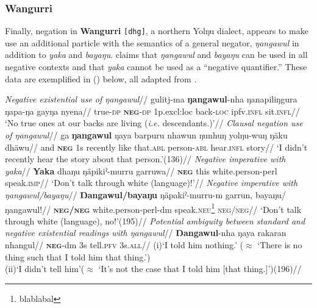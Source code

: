 \subsubsection{Wangurri}

Finally, negation in \textbf{Wangurri} {\tt[dhg]}, a northern Yolŋu dialect, appears to make use an additional particle with the semantics of a general negator, \textit{ŋangawul} in addition to \textit{yaka} and \textit{bayaŋu}. \citet[195]{McLellan1992} claims that \textit{ŋangawul} and \textit{bayaŋu} can be used in all negative contexts and that \textit{yaka} cannot be used as a ``negative quantifier.'' These data are exemplified in (\nextx) below, all adapted from \citet{McLellan1992}.

\pex\a\begingl\glpreamble \textit{Negative existential use of {\em ŋangawul}}//
\gla gulitj-ma \textbf{ŋangawul}-nha ŋanapiliŋgura ŋapa-ŋa gayŋa nyena//
\glb true-\textsc{dp} \textsc{\textbf{neg}-dp} 1\gls{p}.\gls{excl}{:loc} back\textsc{-loc} \gls{ipfv}.\textsc{infl} sit.\textsc{infl}//
\glft`No true ones at our backs are living (\textit{i.e.} descendants.)'//
\endgl
\a\begingl\glpreamble\textit{Clausal negation use of {\em ŋangawul}}//
\gla ga \textbf{ŋangawul} ŋaya barpuru nhawun ŋunhuŋ yolŋu-wuŋ ŋäku dhäwu//
\glb and \textsc{\textbf{neg}} \gls{1}\gls{s} recently like that.\textsc{abl} person\textsc{-abl} hear\textsc{.infl} story//
\glft `I didn't recently hear the story about that person.'\trailingcitation(136)//
\endgl
\a\begingl\glpreamble\textit{Negative imperative with {\em yaka}}//
\gla \textbf{Yaka} dhaŋu ŋäpikiˀ-murru garruwa//
\glb \textsc{\textbf{neg}} this white.person-\gls{perl} speak\textsc{.imp}//
\glft`Don't talk through white (language)!'//
\endgl
\a\begingl\glpreamble\textit{Negative imperative with \emph{ŋangawul/bayaŋu}}//
\gla \textbf{Ŋangawul/bayaŋu} ŋäpakiˀ-murru-m garrun, bayaŋu/ŋangawul!//
\glb \textsc{\textbf{neg/neg}} white.person-\gls{perl}-\gls{dm} speak\textsc{.neu}\footnote{blablabal} \textsc{neg/neg}//
\glft `Don't talk through white (language), no!'\trailingcitation(195)//\endgl
\a\label{dhg-ambig}\begingl\glpreamble\textit{Potential ambiguity between standard and negative existential readings with \emph{ŋangawul}}//
\gla \textbf{Ŋangawul}-nha ŋaya rakaran nhangul//
\glb \textsc{\textbf{neg}}-\gls{dm} \gls{3}\gls{s} tell.\textsc{pfv} 3s.\textsc{all}//
\glft(i)\quad`I told him nothing.' ($\approx$ `There is no thing such that I told him that thing.')\\
(ii)\quad `I didn't tell him'($\approx$ `It's not the case that I told him [that thing.]')\trailingcitation(196)//\endgl
